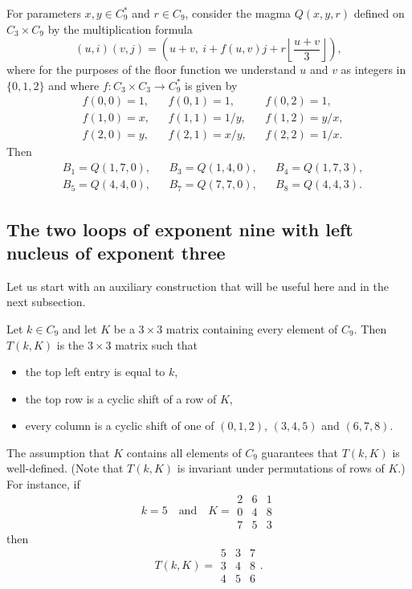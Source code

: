 \documentclass[12pt,reqno]{amsart}
\numberwithin{equation}{section}
\theoremstyle{plain}
\theoremstyle{definition}
\newcommand{\Z}{C}
\begin{document}
For parameters $x,y\in\Z_9^*$ and $r\in\Z_9$, consider the magma $Q(x,y,r)$ defined on $\Z_3\times\Z_9$ by the multiplication formula
\begin{displaymath}
	(u,i)(v,j) = \left(u+v,\ i + f(u,v)j + r\left\lfloor\frac{u+v}{3}\right\rfloor \right),
\end{displaymath}
where for the purposes of the floor function we understand $u$ and $v$ as integers in $\{0,1,2\}$ and where $f:\Z_3\times\Z_3\to\Z_9^*$ is given by
\begin{align*}
	&f(0,0)=1,	&&f(0,1)=1,		&&f(0,2)=1,\\
	&f(1,0)=x,	&&f(1,1)=1/y,	&&f(1,2)=y/x,\\
	&f(2,0)=y,	&&f(2,1)=x/y,	&&f(2,2)=1/x.
\end{align*}
Then
\begin{align*}
	&B_1=Q(1,7,0), &&B_3=Q(1,4,0), &&B_4=Q(1,7,3),\\
	&B_5=Q(4,4,0), &&B_7=Q(7,7,0), &&B_8=Q(4,4,3).
\end{align*}

\subsection{The two loops of exponent nine with left nucleus of exponent three}

Let us start with an auxiliary construction that will be useful here and in the next subsection.

 Let $k\in\Z_9$ and let $K$ be a $3\times 3$ matrix containing every element of $\Z_9$. Then $T(k,K)$ is the $3\times 3$ matrix such that
\begin{itemize}
\item the top left entry is equal to $k$,
\item the top row is a cyclic shift of a row of $K$,
\item every column is a cyclic shift of one of $(0,1,2)$, $(3,4,5)$ and $(6,7,8)$.
\end{itemize}
The assumption that $K$ contains all elements of $\Z_9$ guarantees that $T(k,K)$ is well-defined. (Note that $T(k,K)$ is invariant under permutations of rows of $K$.)
For instance, if
\begin{displaymath}
	k=5\quad\text{and}\quad K = \begin{array}{ccc}2&6&1\\0&4&8\\7&5&3\end{array}
\end{displaymath}
then
\begin{displaymath}
	T(k,K) = \begin{array}{ccc}5&3&7\\3&4&8\\4&5&6\end{array}.
\end{displaymath}
\end{document}
